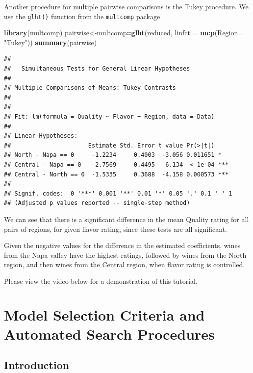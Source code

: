 \documentclass[
]{book}
\newenvironment{Shaded}{\begin{snugshade}}{\end{snugshade}}
\newcommand{\AttributeTok}[1]{\textcolor[rgb]{0.13,0.29,0.53}{#1}}
\newcommand{\FunctionTok}[1]{\textcolor[rgb]{0.13,0.29,0.53}{\textbf{#1}}}
\newcommand{\NormalTok}[1]{#1}
\newcommand{\OtherTok}[1]{\textcolor[rgb]{0.56,0.35,0.01}{#1}}
\newcommand{\SpecialCharTok}[1]{\textcolor[rgb]{0.81,0.36,0.00}{\textbf{#1}}}
\newcommand{\StringTok}[1]{\textcolor[rgb]{0.31,0.60,0.02}{#1}}
\begin{document}
Another procedure for multiple pairwise comparisons is the Tukey procedure. We use the \texttt{glht()} function from the \texttt{multcomp} package

\begin{Shaded}
\begin{Highlighting}[]
\FunctionTok{library}\NormalTok{(multcomp)}
\NormalTok{pairwise}\OtherTok{\textless{}{-}}\NormalTok{multcomp}\SpecialCharTok{::}\FunctionTok{glht}\NormalTok{(reduced, }\AttributeTok{linfct =} \FunctionTok{mcp}\NormalTok{(}\AttributeTok{Region=} \StringTok{"Tukey"}\NormalTok{))}
\FunctionTok{summary}\NormalTok{(pairwise)}
\end{Highlighting}
\end{Shaded}

\begin{verbatim}
## 
##   Simultaneous Tests for General Linear Hypotheses
## 
## Multiple Comparisons of Means: Tukey Contrasts
## 
## 
## Fit: lm(formula = Quality ~ Flavor + Region, data = Data)
## 
## Linear Hypotheses:
##                      Estimate Std. Error t value Pr(>|t|)    
## North - Napa == 0     -1.2234     0.4003  -3.056 0.011651 *  
## Central - Napa == 0   -2.7569     0.4495  -6.134  < 1e-04 ***
## Central - North == 0  -1.5335     0.3688  -4.158 0.000573 ***
## ---
## Signif. codes:  0 '***' 0.001 '**' 0.01 '*' 0.05 '.' 0.1 ' ' 1
## (Adjusted p values reported -- single-step method)
\end{verbatim}

We can see that there is a significant difference in the mean Quality rating for all pairs of regions, for given flavor rating, since these tests are all significant.

Given the negative values for the difference in the estimated coefficients, wines from the Napa valley have the highest ratings, followed by wines from the North region, and then wines from the Central region, when flavor rating is controlled.

Please view the video below for a demonstration of this tutorial.

\hypertarget{crit}{%
\chapter{Model Selection Criteria and Automated Search Procedures}\label{crit}}

\hypertarget{introduction-8}{%
\section{Introduction}\label{introduction-8}}
\end{document}
